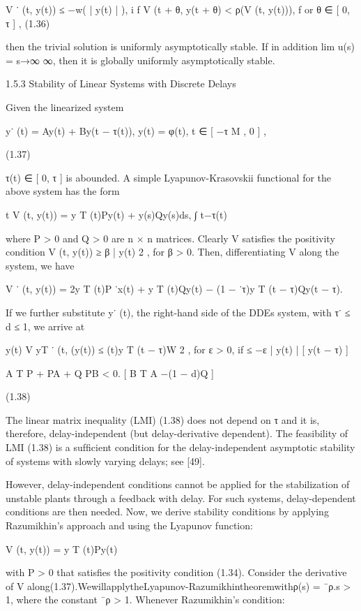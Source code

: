 \documentclass[12pt]{article}
\begin{document}
V ˙ (t, y(t)) ≤ −w( | y(t) | ), i f V (t + θ, y(t + θ) < ρ(V (t, y(t))), f or θ ∈ [ 0, τ ] , (1.36)

then the trivial solution is uniformly asymptotically stable. If in addition lim u(s) = s→∞ ∞, then it is globally uniformly 
asymptotically stable.

1.5.3 Stability of Linear Systems with Discrete Delays

Given the linearized system

y˙ (t) = Ay(t) + By(t − τ(t)), y(t) = φ(t), t ∈ [ −τ M , 0 ] ,

(1.37)

τ(t) ∈ [ 0, τ ] is abounded. A simple Lyapunov-Krasovskii functional for the above system has the form

t V (t, y(t)) = y T (t)Py(t) + y(s)Qy(s)ds, ∫ t−τ(t)

where P > 0 and Q > 0 are n × n matrices. Clearly V satisﬁes the positivity condition V (t, y(t)) ≥ β | y(t) 2 , for β > 0. Then, 
differentiating V along the system, we have

V ˙ (t, y(t)) = 2y T (t)P ˙x(t) + y T (t)Qy(t) − (1 − ˙τ)y T (t − τ)Qy(t − τ).

If we further substitute y˙ (t), the right-hand side of the DDEs system, with τ˙ ≤ d ≤ 1, we arrive at

y(t) V yT  ˙ (t, (y(t)) ≤ (t)y T (t − τ)W 2 , for ε > 0, if ≤ −ε | y(t) | [ y(t − τ) ]

A T P + PA + Q PB < 0. [ B T A −(1 − d)Q ]

(1.38)

The linear matrix inequality (LMI) (1.38) does not depend on τ and it is, therefore, delay-independent (but delay-derivative dependent). The 
feasibility of LMI (1.38) is a sufﬁcient condition for the delay-independent asymptotic stability of systems with slowly varying delays; see 
[49].

However, delay-independent conditions cannot be applied for the stabilization of unstable plants through a feedback with delay. For such 
systems, delay-dependent conditions are then needed. Now, we derive stability conditions by applying Razumikhin’s approach and using the 
Lyapunov function:

V (t, y(t)) = y T (t)Py(t)

with P > 0 that satisﬁes the positivity condition (1.34). Consider the derivative of V 
along(1.37).WewillapplytheLyapunov-Razumikhintheoremwithρ(s) = ¯ρ.s > 1, where the constant ¯ρ > 1. Whenever Razumikhin’s condition:
\end{document}
